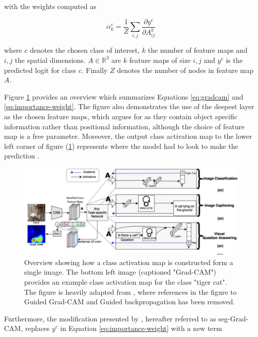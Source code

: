 \documentclass[../main/thesis.tex]{subfiles}
\begin{document}
with the weights computed as

\begin{equation}
    \label{eq:importance-weight}
    \alpha_k^c = \frac{1}{Z} \sum_{i,j} \frac{\partial{y^c}}{\partial{A_{ij}^k}}
\end{equation}

where $c$ denotes the chosen class of interest, $k$ the number of feature maps and $i,j$ the spatial dimensions. $A \in \mathbb{R}^3$ are $k$ feature maps of size $i,j$ and $y^c$ is the predicted logit for class $c$. Finally $Z$ denotes the number of nodes in feature map $A$. 

Figure \ref{fig:gradcam} provides an overview which summarizes Equations \ref{eq:gradcam} and \ref{eq:importance-weight}. The figure also demonstrates the use of the deepest layer as the chosen feature maps, which \citet{Selvaraju2016} argues for as they contain object specific information rather than positional information, although the choice of feature map is a free parameter. Moreover, the output class activation map to the lower left corner of figure (\ref{fig:gradcam}) represents where the model had to look to make the prediction \citep{Selvaraju2016}.

\begin{figure}
    \centering
    \includegraphics[width=\textwidth]{GradCAM}
    \caption{\label{fig:gradcam}Overview showing how a class activation map is constructed form a single image. The bottom left image (captioned "Grad-CAM") provides an example class activation map for the class "tiger cat". The figure is heavily adapted from \protect\citet{Selvaraju2016}, where references in the figure to Guided Grad-CAM and Guided backpropagation has been removed.}
\end{figure}

Furthermore, the modification presented by \citet{Vinogradova2020}, hereafter referred to as seg-Grad-CAM, replaces $y^c$ in Equation \ref{eq:importance-weight} with a new term 
\end{document}
